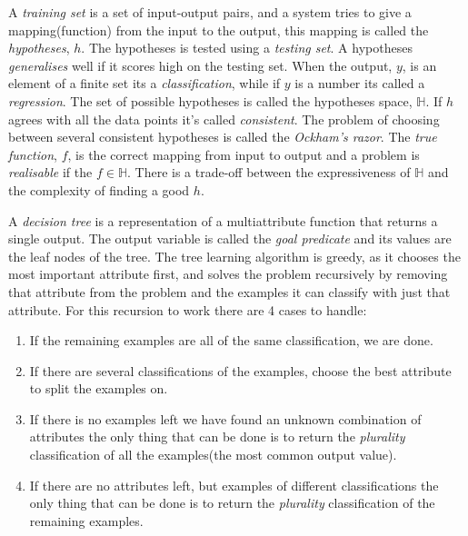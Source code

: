 \documentclass[11pt, letterpaper]{report}
\numberwithin{equation}{section}
\begin{document}
A \emph{training set} is a set of input-output pairs, and a system tries to
give a mapping(function) from the input to the output, this mapping is called the
\emph{hypotheses}, $h$. The hypotheses is tested using a \emph{testing set}. A
hypotheses \emph{generalises} well if it scores high on the testing set.
When the output, $y$, is an element of a finite set its a \emph{classification},
while if $y$ is a number its called a \emph{regression}. The set of possible hypotheses
is called the hypotheses space, $\mathbb{H}$. If $h$ agrees with all the data
points it's called \emph{consistent}. The problem of choosing between several
consistent hypotheses is called the \emph{Ockham's razor}. The \emph{true
  function}, $f$, is the correct mapping from input to output and a problem is
\emph{realisable} if the $f \in \mathbb{H} $. There is a trade-off between the
expressiveness of $\mathbb{H} $ and the complexity of finding a good $h$.

A \emph{decision tree} is a representation of a multiattribute function that
returns a single output. The output variable is called the \emph{goal predicate}
and its values are the leaf nodes of the tree. The tree learning algorithm is
greedy, as it chooses the most important attribute first, and solves the problem
recursively by removing that attribute from the problem and the examples it can
classify with just that attribute. For this recursion to work there are 4 cases
to handle:
\begin{enumerate}
\item If the remaining examples are all of the same classification, we are done.
\item If there are several classifications of the examples, choose the best
  attribute to split the examples on.
\item If there is no examples left we have found an unknown combination of
    attributes the only thing that can be done is to return the
    \emph{plurality} classification of all the examples(the most common output
    value).
\item If there are no attributes left, but examples of
    different classifications the only thing that can be done is to return the
    \emph{plurality} classification of the remaining examples.
\end{enumerate}
\end{document}
